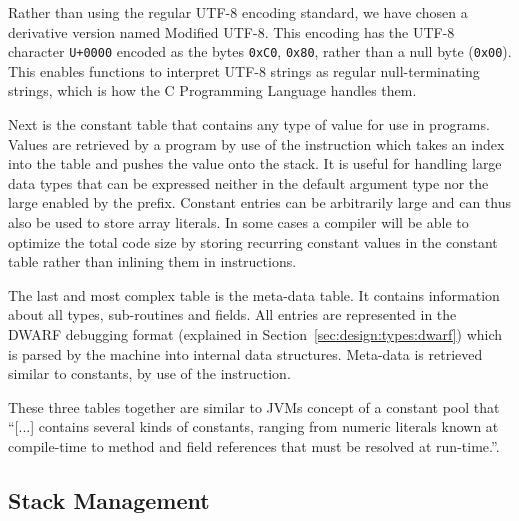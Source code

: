 Rather than using the regular UTF-8 encoding standard, we have chosen a
derivative version named Modified UTF-8. This encoding has the UTF-8 character
{\tt U+0000} encoded as the bytes {\tt 0xC0}, {\tt 0x80}, rather than a null
byte ({\tt 0x00}). This enables functions to interpret UTF-8 strings as regular
null-terminating strings, which is how the C Programming Language handles
them.

Next is the constant table that contains any type of value for use in
programs. Values are retrieved by a program by use of the 
instruction which takes an index into the table and pushes the value onto the
stack. It is useful for handling large data types that can be expressed neither
in the default  argument type nor the large  enabled by
the  prefix. Constant entries can be arbitrarily large and can thus
also be used to store array literals. In some cases a compiler will be able to
optimize the total code size by storing recurring constant values in the
constant table rather than inlining them in instructions.

The last and most complex table is the meta-data table. It contains information
about all types, sub-routines and fields. All entries are represented in the
DWARF debugging format (explained in Section~\ref{sec:design:types:dwarf}) which
is parsed by the machine into internal data structures. Meta-data is retrieved
similar to constants, by use of the  instruction.

These three tables together are similar to JVMs concept of a constant pool that
``[...] contains several kinds of constants, ranging from numeric literals known
at compile-time to method and field references that must be resolved at
run-time.''\cite[Section 2.5.5]{jvm-spec}.

\subsection{Stack Management}
\label{sec:design:stack-mgmt}

